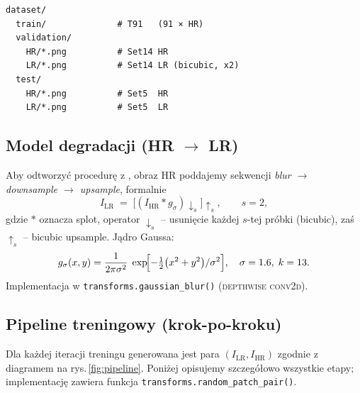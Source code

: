 \documentclass[11pt]{article}
\begin{document}
\begin{verbatim}
dataset/
  train/              # T91   (91 × HR)
  validation/
    HR/*.png          # Set14 HR
    LR/*.png          # Set14 LR (bicubic, x2)
  test/
    HR/*.png          # Set5  HR
    LR/*.png          # Set5  LR
\end{verbatim}

\subsection{Model degradacji (HR $\rightarrow$ LR)}
\label{sec:data_degradation}

Aby odtworzyć procedurę z
, obraz HR poddajemy sekwencji
\emph{blur $\rightarrow$ downsample $\rightarrow$ upsample}, formalnie
\[
I_\mathrm{LR} \;=\;
\bigl[(I_\mathrm{HR} * g_\sigma) \downarrow_s\bigr]\!\uparrow_s ,
\qquad s = 2,
\]
gdzie $*$ oznacza splot, operator $\downarrow_s$ – usunięcie każdej
$s$-tej próbki (bicubic), zaś $\uparrow_s$ – bicubic upsample.  
Jądro Gaussa:
\begin{equation}
g_\sigma(x,y)=\frac{1}{2\pi\sigma^{2}}\;
  \exp\!\Bigl[-\tfrac12\bigl(x^{2}+y^{2}\bigr)/\sigma^{2}\Bigr],
\quad
\sigma=1.6,\; k=13.
\end{equation}
Implementacja w \texttt{transforms.gaussian\_blur()} (\textsc{depthwise conv2d}).

\subsection{Pipeline treningowy (krok-po-kroku)}
\label{sec:data_pipeline}

Dla każdej iteracji treningu generowana jest para
\((I_\mathrm{LR}, I_\mathrm{HR})\) zgodnie z diagramem
na rys.\,\ref{fig:pipeline}.  Poniżej opisujemy szczegółowo wszystkie
etapy; implementację zawiera funkcja
\texttt{transforms.random\_patch\_pair()}.
\end{document}
